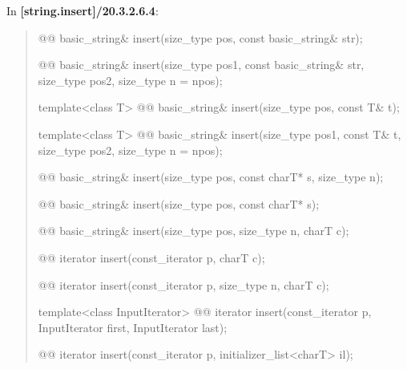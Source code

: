 \documentclass{wg21}
\begin{document}
In \textbf{[string.insert]/20.3.2.6.4}:
\begin{quote}
\begin{itemdecl}
@@ basic_string& insert(size_type pos, const basic_string& str);
\end{itemdecl}

\begin{itemdecl}
@@
basic_string& insert(size_type pos1, const basic_string& str, size_type pos2, size_type n = npos);
\end{itemdecl}

\begin{itemdecl}
template<class T>
  @@ basic_string& insert(size_type pos, const T& t);
\end{itemdecl}

\begin{itemdecl}
template<class T>
  @@
  basic_string& insert(size_type pos1, const T& t, size_type pos2, size_type n = npos);
\end{itemdecl}

\begin{itemdecl}
@@ basic_string& insert(size_type pos, const charT* s, size_type n);
\end{itemdecl}

\begin{itemdecl}
@@ basic_string& insert(size_type pos, const charT* s);
\end{itemdecl}

\begin{itemdecl}
@@ basic_string& insert(size_type pos, size_type n, charT c);
\end{itemdecl}

\begin{itemdecl}
@@ iterator insert(const_iterator p, charT c);
\end{itemdecl}

\begin{itemdecl}
@@ iterator insert(const_iterator p, size_type n, charT c);
\end{itemdecl}

\begin{itemdecl}
template<class InputIterator>
  @@ iterator insert(const_iterator p, InputIterator first, InputIterator last);
\end{itemdecl}

\begin{itemdecl}
@@ iterator insert(const_iterator p, initializer_list<charT> il);
\end{itemdecl}
\end{quote}
\end{document}
